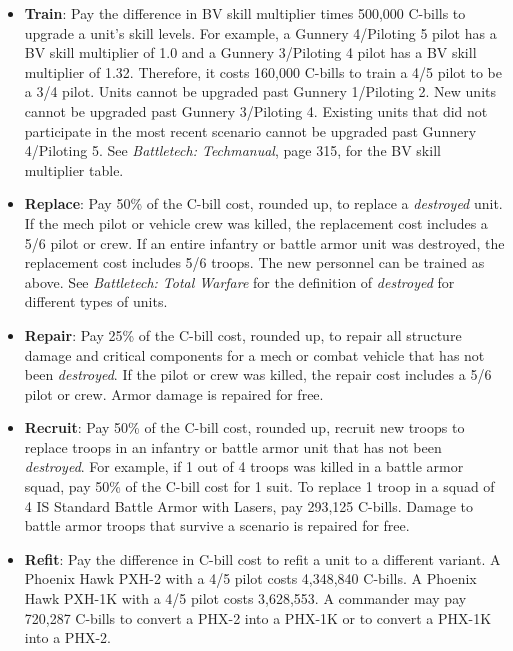 \documentclass[UTF8]{article}
\begin{document}
\begin{itemize}

\item {\bf Train}: Pay the difference in BV skill multiplier times 500,000 C-bills to upgrade a unit's skill levels.
For example, a Gunnery 4/Piloting 5 pilot has a BV skill multiplier of 1.0 and a Gunnery 3/Piloting 4 pilot has a BV skill multiplier of 1.32.
Therefore, it costs 160,000 C-bills to train a 4/5 pilot to be a 3/4 pilot.
Units cannot be upgraded past Gunnery 1/Piloting 2.
New units cannot be upgraded past Gunnery 3/Piloting 4.
Existing units that did not participate in the most recent scenario cannot be upgraded past Gunnery 4/Piloting 5.
See \emph{Battletech: Techmanual}, page 315, for the BV skill multiplier table.

\item {\bf Replace}: Pay 50\% of the C-bill cost, rounded up, to replace a \emph{destroyed} unit.
If the mech pilot or vehicle crew was killed, the replacement cost includes a 5/6 pilot or crew.
If an entire infantry or battle armor unit was destroyed, the replacement cost includes 5/6 troops.
The new personnel can be trained as above.
See \emph{Battletech: Total Warfare} for the definition of \emph{destroyed} for different types of units.

\item {\bf Repair}: Pay 25\% of the C-bill cost, rounded up, to repair all structure damage and critical components for a mech or combat vehicle that has not been \emph{destroyed}.
If the pilot or crew was killed, the repair cost includes a 5/6 pilot or crew.
Armor damage is repaired for free.

\item {\bf Recruit}: Pay 50\% of the C-bill cost, rounded up, recruit new troops to replace troops in an infantry or battle armor unit that has not been \emph{destroyed}.
For example, if 1 out of 4 troops was killed in a battle armor squad, pay 50\% of the C-bill cost for 1 suit.
To replace 1 troop in a squad of 4 IS Standard Battle Armor with Lasers, pay 293,125 C-bills.
Damage to battle armor troops that survive a scenario is repaired for free.

\item {\bf Refit}: Pay the difference in C-bill cost to refit a unit to a different variant.
A Phoenix Hawk PXH-2 with a 4/5 pilot costs 4,348,840 C-bills.
A Phoenix Hawk PXH-1K with a 4/5 pilot costs 3,628,553.
A commander may pay 720,287 C-bills to convert a PHX-2 into a PHX-1K or to convert a PHX-1K into a PHX-2.


\end{itemize}
\end{document}
